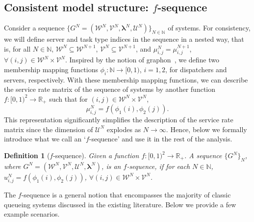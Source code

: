 \documentclass[11pt, reqno]{article}
\newtheorem{defn}[theorem]{Definition}
\numberwithin{equation}{section}
\numberwithin{theorem}{section}
\newcommand{\R}{\mathbb{R}}                 %
\newcommand{\N}{\mathbb{N}}                 %
\begin{document}
\subsection{Consistent model structure: $f$-sequence}
Consider a sequence $\{G^N=(\mathcal{W}^N,\mathcal{V}^N,\boldsymbol\lambda^N,\mathcal{U}^N)\}_{N\in\N}$ of systems. 
For consistency, we will define server and task type indices in the sequence in a nested way, that is, for all $N\in\N$, $\mathcal{W}^N\subseteq\mathcal{W}^{N+1}$, $\mathcal{V}^N\subseteq\mathcal{V}^{N+1}$, and $\mu^N_{i,j}=\mu^{N+1}_{i,j}$, $\forall (i,j)\in\mathcal{W}^N\times\mathcal{V}^N$. 
Inspired by the notion of graphon~\cite[Chapter~7]{ll12}, we define two membership mapping functions $\phi_i:\N\rightarrow [0,1)$, $i=1,2$, for dispatchers and servers, respectively. 
With these membership mapping functions, we can describe the service rate matrix of the sequence of systems by another function $f:[0,1)^2\rightarrow\R_+$ such that for $(i,j)\in\mathcal{W}^N\times \mathcal{V}^N$, $$\mu^N_{i,j} = f(\phi_1(i),\phi_2(j)).$$
This representation significantly simplifies the description of the service rate matrix since the dimension of $\mathcal{U}^N$ explodes as $N\rightarrow\infty$. 
Hence, below we formally introduce what we call an `$f$-sequence' and use it in the rest of the analysis.

\begin{defn}[$f$-sequence]\label{def:f-sequence}
Given a function $f:[0,1)^2\rightarrow\R_+$. A sequence $\{G^N\}_{N}$, where $G^N=(\mathcal{W}^N,\mathcal{V}^N,\mathcal{U}^N,\boldsymbol\lambda^N)$, is an $f$-sequence, if for each $N\in\N$, $u^N_{i,j}=f(\phi_1(i),\phi_2(j))$, $\forall (i,j)\in\mathcal{W}^N\times \mathcal{V}^N$.
\end{defn}
\noindent
The $f$-sequence is a general notion that encompasses the majority of classic queueing systems discussed in the existing literature.
Below we provide a few example scenarios. 
\end{document}
